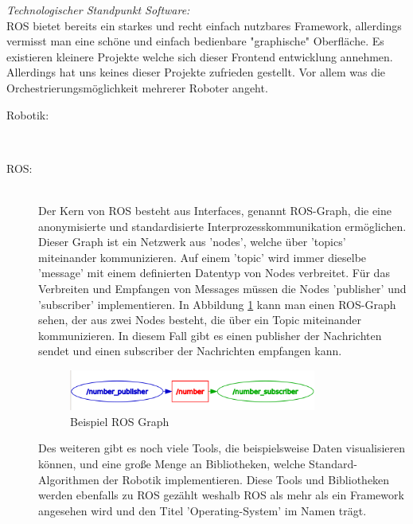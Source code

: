 \begin{flushleft}
    \textit{Technologischer Standpunkt Software:}\\
    ROS bietet bereits ein starkes und recht einfach nutzbares Framework, allerdings vermisst man eine 
    schöne und einfach bedienbare "graphische" Oberfläche.
    Es existieren kleinere Projekte welche sich dieser Frontend entwicklung annehmen. 
    Allerdings hat uns keines dieser Projekte zufrieden gestellt. 
    Vor allem was die Orchestrierungsmöglichkeit mehrerer Roboter angeht.

    \begin{description}
        \item[Robotik:]\hfill\\
        
        \item[ROS:]\hfill\\
        Der Kern von ROS besteht aus Interfaces, genannt ROS-Graph, die eine anonymisierte und standardisierte Interprozesskommunikation ermöglichen.
        Dieser Graph ist ein Netzwerk aus 'nodes', welche über 'topics' miteinander kommunizieren.
        Auf einem 'topic' wird immer dieselbe 'message' mit einem definierten Datentyp von Nodes verbreitet. 
        Für das Verbreiten und Empfangen von Messages müssen die Nodes 'publisher' und 'subscriber' implementieren.
        In Abbildung \ref{fig:ros_graph} kann man einen ROS-Graph sehen, der aus zwei Nodes besteht, die über ein Topic miteinander kommunizieren.
        In diesem Fall gibt es einen publisher der Nachrichten sendet und einen subscriber der Nachrichten empfangen kann.

        \begin{figure}[h!]
            \centering
            \includegraphics[width=0.8\textwidth]{imgs/Grundbegriffe/graph_2_nodes_with_topic.png}
            \caption{Beispiel ROS Graph}
            \label{fig:ros_graph}%
        \end{figure}

        Des weiteren gibt es noch viele Tools, die beispielsweise Daten visualisieren können, und eine große Menge an Bibliotheken, welche Standard-Algorithmen der Robotik implementieren.
        Diese Tools und Bibliotheken werden ebenfalls zu ROS gezählt weshalb ROS als mehr als ein Framework angesehen wird und den Titel 'Operating-System' im Namen trägt.


\end{description}
\end{flushleft}
